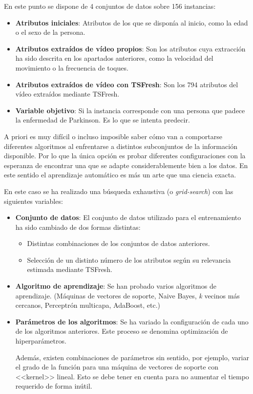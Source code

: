 En este punto se dispone de 4 conjuntos de datos sobre 156 instancias:

\begin{itemize}
    \item \textbf{Atributos iniciales}: Atributos de los que se disponía al
    inicio, como la edad o el sexo de la persona.
    \item \textbf{Atributos extraídos de vídeo propios}: Son los atributos cuya
    extracción ha sido descrita en los apartados anteriores, como la velocidad
    del movimiento o la frecuencia de toques.
    \item \textbf{Atributos extraídos de vídeo con TSFresh}: Son los 794
    atributos del vídeo extraídos mediante TSFresh.
    \item \textbf{Variable objetivo}: Si la instancia corresponde con una
    persona que padece la enfermedad de Parkinson. Es lo que se intenta predecir.
\end{itemize}

A priori es muy difícil o incluso imposible saber cómo van a comportarse
diferentes algoritmos al enfrentarse a distintos subconjuntos de la información
disponible. Por lo que la única opción es probar diferentes configuraciones con
la esperanza de encontrar una que se adapte considerablemente bien a los datos.
En este sentido el aprendizaje automático es más un arte que una ciencia exacta.

En este caso se ha realizado una búsqueda exhaustiva (o \textit{grid-search})
con las siguientes variables:

\begin{itemize}
    \item \textbf{Conjunto de datos}: El conjunto de datos utilizado para el
    entrenamiento ha sido cambiado de dos formas distintas:
    \begin{itemize}
        \item Distintas combinaciones de los conjuntos de datos anteriores.
        \item Selección de un distinto número de los atributos según su
        relevancia estimada mediante TSFresh.
    \end{itemize}
    \item \textbf{Algoritmo de aprendizaje}: Se han probado varios algoritmos de
    aprendizaje. (Máquinas de vectores de soporte, Naive Bayes, \textit{k}
    vecinos más cercanos, Perceptrón multicapa, AdaBoost, etc.)
    \item \textbf{Parámetros de los algoritmos}: Se ha variado la configuración
    de cada uno de los algoritmos anteriores. Este proceso se denomina
    optimización de hiperparámetros.
    
    Además, existen combinaciones de parámetros sin sentido, por ejemplo, variar
    el grado de la función para una máquina de vectores de soporte con
    <<kernel>> lineal. Esto se debe tener en cuenta para no aumentar el tiempo
    requerido de forma inútil.
\end{itemize}

